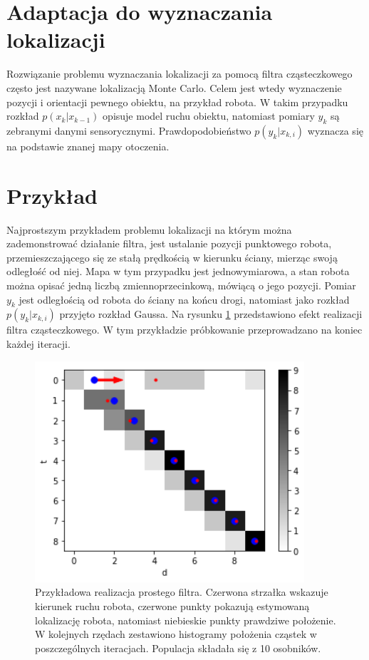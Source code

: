 \section{Adaptacja do wyznaczania lokalizacji}
Rozwiązanie problemu wyznaczania lokalizacji za pomocą filtra cząsteczkowego często jest nazywane lokalizacją Monte Carlo. Celem jest wtedy wyznaczenie pozycji i orientacji pewnego obiektu, na przykład robota. W takim przypadku rozkład $p(x_k|x_{k-1})$ opisuje model ruchu obiektu, natomiast pomiary $y_k$ są zebranymi danymi sensorycznymi. Prawdopodobieństwo $p(y_k|x_{k,i})$ wyznacza się na podstawie znanej mapy otoczenia.

\section{Przykład}\label{simple_example_chap}
Najprostszym przykładem problemu lokalizacji na którym można zademonstrować działanie filtra, jest ustalanie pozycji punktowego robota, przemieszczającego się ze stałą prędkością w kierunku ściany, mierząc swoją odległość od niej. Mapa w tym przypadku jest jednowymiarowa, a stan robota można opisać jedną liczbą zmiennoprzecinkową, mówiącą o jego pozycji. Pomiar $y_k$ jest odległością od robota do ściany na końcu drogi, natomiast jako rozkład $p(y_k|x_{k,i})$ przyjęto rozkład Gaussa. Na rysunku \ref{simple_example} przedstawiono efekt realizacji filtra cząsteczkowego. W tym przykładzie próbkowanie przeprowadzano na koniec każdej iteracji.

\begin{figure}[H]
	\begin{center}
		\includegraphics[width=10cm]{./simple_example.png}
		\caption[Przykładowa realizacja prostego filtra.]{Przykładowa realizacja prostego filtra. Czerwona strzałka wskazuje kierunek ruchu robota, czerwone punkty pokazują estymowaną lokalizację robota, natomiast niebieskie punkty prawdziwe położenie. W kolejnych rzędach zestawiono histogramy położenia cząstek w poszczególnych iteracjach. Populacja składała się z 10 osobników.}\label{simple_example}
	\end{center}
\end{figure}

